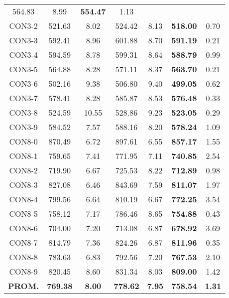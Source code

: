 \begin{table}[ht]
\begin{tabular}{c c c c c c c}
564.83 & 8.99 & \bf{554.47} & 
1.13\\CON3-2 & 521.63 & 8.02 & 
524.42 & 8.13 & \bf{518.00} & 
0.70\\CON3-3 & 592.41 & 8.96 & 
601.88 & 8.70 & \bf{591.19} & 
0.21\\CON3-4 & 594.59 & 8.78 & 
599.31 & 8.64 & \bf{588.79} & 
0.99\\CON3-5 & 564.88 & 8.28 & 
571.11 & 8.37 & \bf{563.70} & 
0.21\\CON3-6 & 502.16 & 9.38 & 
506.80 & 9.40 & \bf{499.05} & 
0.62\\CON3-7 & 578.41 & 8.28 & 
585.87 & 8.53 & \bf{576.48} & 
0.33\\CON3-8 & 524.59 & 10.55 & 
528.86 & 9.23 & \bf{523.05} & 
0.29\\CON3-9 & 584.52 & 7.57 & 
588.16 & 8.20 & \bf{578.24} & 
1.09\\CON8-0 & 870.49 & 6.72 & 
897.61 & 6.55 & \bf{857.17} & 
1.55\\CON8-1 & 759.65 & 7.41 & 
771.95 & 7.11 & \bf{740.85} & 
2.54\\CON8-2 & 719.90 & 6.67 & 
725.53 & 8.22 & \bf{712.89} & 
0.98\\CON8-3 & 827.08 & 6.46 & 
843.69 & 7.59 & \bf{811.07} & 
1.97\\CON8-4 & 799.56 & 6.64 & 
810.19 & 6.67 & \bf{772.25} & 
3.54\\CON8-5 & 758.12 & 7.17 & 
786.46 & 8.65 & \bf{754.88} & 
0.43\\CON8-6 & 704.00 & 7.20 & 
713.08 & 6.87 & \bf{678.92} & 
3.69\\CON8-7 & 814.79 & 7.36 & 
824.26 & 6.87 & \bf{811.96} & 
0.35\\CON8-8 & 783.63 & 6.83 & 
792.56 & 7.20 & \bf{767.53} & 
2.10\\CON8-9 & 820.45 & 8.60 & 
831.34 & 8.03 & \bf{809.00} & 
1.42\\\bf{PROM.} & 
\bf{769.38} & \bf{8.00} & \bf{778.62} & \bf{7.95} & \bf{758.54} & \bf{1.31}\\[1ex]\hline
\end{tabular}
\label{table:nonlin}
\end{table} \clearpage
